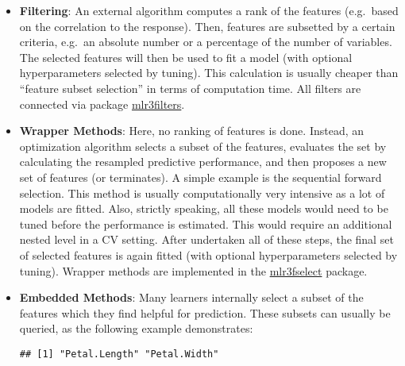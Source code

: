\documentclass[
]{scrbook}
\newenvironment{Shaded}{\begin{snugshade}}{\end{snugshade}}
\newcommand{\CommentTok}[1]{\textcolor[rgb]{0.56,0.35,0.01}{\textit{#1}}}
\newcommand{\FunctionTok}[1]{\textcolor[rgb]{0.00,0.00,0.00}{#1}}
\newcommand{\NormalTok}[1]{#1}
\newcommand{\OtherTok}[1]{\textcolor[rgb]{0.56,0.35,0.01}{#1}}
\newcommand{\SpecialCharTok}[1]{\textcolor[rgb]{0.00,0.00,0.00}{#1}}
\newcommand{\StringTok}[1]{\textcolor[rgb]{0.31,0.60,0.02}{#1}}
\renewenvironment{Shaded} {\begin{snugshade}\small} {\end{snugshade}}
\begin{document}
\begin{itemize}
\item
  \textbf{Filtering}:
  An external algorithm computes a rank of the features (e.g.~based on the correlation to the response).
  Then, features are subsetted by a certain criteria, e.g.~an absolute number or a percentage of the number of variables.
  The selected features will then be used to fit a model (with optional hyperparameters selected by tuning).
  This calculation is usually cheaper than ``feature subset selection'' in terms of computation time.
  All filters are connected via package \href{https://mlr3filters.mlr-org.com}{mlr3filters}.
\item
  \textbf{Wrapper Methods}:
  Here, no ranking of features is done.
  Instead, an optimization algorithm selects a subset of the features, evaluates the set by calculating the resampled predictive performance, and then
  proposes a new set of features (or terminates).
  A simple example is the sequential forward selection.
  This method is usually computationally very intensive as a lot of models are fitted.
  Also, strictly speaking, all these models would need to be tuned before the performance is estimated.
  This would require an additional nested level in a CV setting.
  After undertaken all of these steps, the final set of selected features is again fitted (with optional hyperparameters selected by tuning).
  Wrapper methods are implemented in the \href{https://mlr3fselect.mlr-org.com}{mlr3fselect} package.
\item
  \textbf{Embedded Methods}:
  Many learners internally select a subset of the features which they find helpful for prediction.
  These subsets can usually be queried, as the following example demonstrates:

\begin{Shaded}
\end{Shaded}

\begin{verbatim}
## [1] "Petal.Length" "Petal.Width"
\end{verbatim}
\end{itemize}
\end{document}
